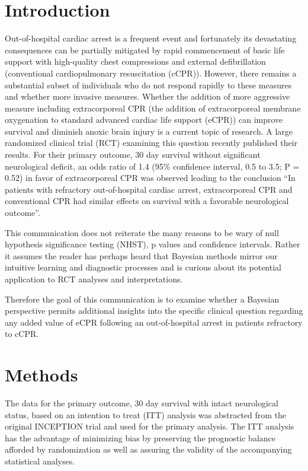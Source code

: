 \documentclass[
  super,
  preprint,
  3p]{elsarticle}
\begin{document}
\hypertarget{introduction}{%
\section{Introduction}\label{introduction}}

Out-of-hospital cardiac arrest is a frequent event and fortunately its
devastating consequences can be partially mitigated by rapid
commencement of basic life support with high-quality chest compressions
and external defibrillation (conventional cardiopulmonary resuscitation
(cCPR)). However, there remains a substantial subset of individuals who
do not respond rapidly to these measures and whether more invasive
measures. Whether the addition of more aggressive measure including
extracorporeal CPR (the addition of extracorporeal membrane oxygenation
to standard advanced cardiac life support (eCPR)) can improve survival
and diminish anoxic brain injury is a current topic of research. A large
randomized clinical trial (RCT) examining this question recently
published their results\citep{CPR2023a}. For their primary outcome, 30
day survival without significant neurological deficit, an odds ratio of
1.4 (95\% confidence interval, 0.5 to 3.5; P = 0.52) in favor of
extracorporeal CPR was observed leading to the conclusion ``In patients
with refractory out-of-hospital cardiac arrest, extracorporeal CPR and
conventional CPR had similar effects on survival with a favorable
neurological outcome''.\citep{CPR2023a}

This communication does not reiterate the many reasons to be wary of
null hypothesis significance testing (NHST), p values and confidence
intervals\citep{RN5420}. Rather it assumes the reader has perhaps heard
that Bayesian methods mirror our intuitive learning and diagnostic
processes and is curious about its potential application to RCT analyses
and interpretations.

Therefore the goal of this communication is to examine whether a
Bayesian perspective permits additional insights into the specific
clinical question regarding any added value of eCPR following an
out-of-hospital arrest in patients refractory to cCPR.

\hypertarget{methods}{%
\section{Methods}\label{methods}}

The data for the primary outcome, 30 day survival with intact
neurological status, based on an intention to treat (ITT) analysis was
abstracted from the original INCEPTION trial \citep{CPR2023a} and used
for the primary analysis. The ITT analysis has the advantage of
minimizing bias by preserving the prognostic balance afforded by
randomization as well as assuring the validity of the accompanying
statistical analyses.
\end{document}
